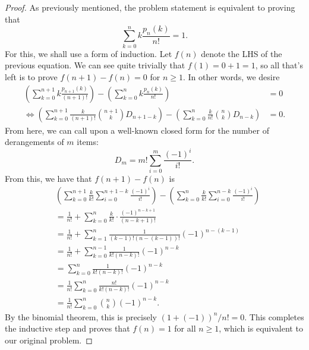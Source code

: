\begin{proof}
    As previously mentioned, the problem statement is equivalent to proving that
    \[
        \sum_{k = 0}^{n} k \frac{p_n (k)}{n!} = 1
    .\]
    For this, we shall use a form of induction. Let \( f(n) \) denote the LHS
    of the previous equation. We can see quite trivially that \( f(1) = 0 + 1 =
    1 \), so all that's left is to prove \( f(n + 1) - f(n) = 0 \) for \( n \geqslant 1 \). In other words, we desire
    \begin{align*}
        \left( \sum_{k = 0}^{n + 1} k \frac{p_{n + 1}(k)}{(n+1)!} \right) - \left( \sum_{k = 0}^{n} k \frac{p_n (k)}{n!} \right) &= 0 \\
        \iff \left( \sum_{k = 0}^{n + 1} \frac{k}{(n + 1)!} \binom{n + 1}{k} D_{n + 1 - k} \right) - \left( \sum_{k = 0}^{n} \frac{k}{n!} \binom{n}{k} D_{n - k} \right) &= 0
    .\end{align*}
    From here, we can call upon a well-known 
    closed form for the number of derangements of \( m \) items:
    \[
        D_m = m! \sum_{i = 0}^{m} \frac{(-1)^i}{i!}
    .\]
    From this, we have that \( f(n+1) - f(n) \) is
    \begin{align*}
        &\left( \sum_{k = 0}^{n + 1} \frac{k}{k!} \sum_{i = 0}^{n + 1 - k} \frac{(-1)^i}{i!} \right) - \left( \sum_{k = 0}^{n} \frac{k}{k!} \sum_{i = 0}^{n - k} \frac{(-1)^i}{i!} \right) \\
        &= \frac{1}{n!} + \sum_{k = 0}^{n} \frac{k}{k!} \cdot \frac{(-1)^{n - k + 1}}{(n - k + 1)!} \\
        &= \frac{1}{n!} + \sum_{k = 1}^{n} \frac{1}{(k - 1)! \left( n - (k - 1) \right)!} (-1)^{n - (k - 1)} \\
        &= \frac{1}{n!} + \sum_{k = 0}^{n - 1} \frac{1}{k! (n - k)!} (-1)^{n - k} \\
        &= \sum_{k = 0}^{n} \frac{1}{k! (n - k)!} (-1)^{n - k} \\
        &= \frac{1}{n!} \sum_{k = 0}^{n} \frac{n!}{k! (n - k)!} (-1)^{n - k} \\
        &= \frac{1}{n!} \sum_{k = 0}^{n} \binom{n}{k} (-1)^{n - k}
    .\end{align*}
    By the binomial theorem, this is precisely \( (1 + (-1))^n / n! = 0 \).
    This completes the inductive step and proves that \( f(n) = 1 \) for all \(
    n \geqslant 1 \), which is equivalent to our original problem.
\end{proof}

